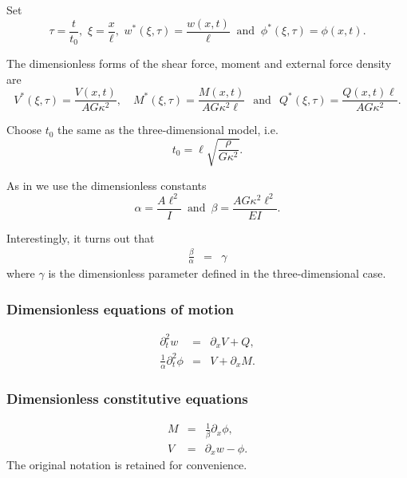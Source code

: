 			Set \[\tau = \frac{t}{t_0}, \,\, \xi = \frac{x}{\ell}, \,\, w^*(\xi,\tau) = \frac{w(x,t)}{\ell} \ \text{ and } \ \phi^*(\xi, \tau) = \phi(x,t).\]

			The dimensionless forms of the shear force, moment and external force density are \[ V^{*}(\xi,\tau) = \frac{V(x,t)}{AG\kappa^2}, \quad M^{*}(\xi,\tau) = \frac{M(x,t)}{A G\kappa^2 \ell} \,\,\, \ \text{and} \ \,\,\, Q^*(\xi,\tau) = \frac{Q(x,t)\ell}{A G\kappa^2}.\]

			Choose $t_0$ the same as the three-dimensional model, i.e. \[t_0 = \ell\sqrt{\frac{\rho}{G\kappa^2}}.\]

			As in \cite{LVV09} we use the dimensionless constants
			\begin{equation*}
				\alpha = \frac{A \ell^2}{I} \,\,\, \text{and} \,\,\, \beta
				=\frac{AG\kappa^2 \ell^2}{EI}.
			\end{equation*}\label{sym:alphabeta}

			Interestingly, it turns out that
			\begin{eqnarray*}
				\frac{\beta}{\alpha} & = & \gamma
			\end{eqnarray*} where $\gamma$ is the dimensionless parameter defined in the three-dimensional case.\\

		\subsubsection*{Dimensionless equations of motion}\label{sssec:1D_Model:DimensionlessEquationsOfMotion}
			\begin{eqnarray}
				\partial_{t}^{2} w &=& \partial_{x}V + Q, \label{eq:1D_Model:EquationOfMotion1D}\\
				\frac{1}{\alpha} \partial_{t}^{2} \phi &=& V + \partial_{x}M.\label{eq:1D_Model:EquationOfMotion2D}
			\end{eqnarray}
		\subsubsection*{Dimensionless constitutive equations}\label{sssec:1D_Model:DimensionlessConstitutiveEquations}
			\begin{eqnarray}
				M &=& \frac{1}{\beta}\partial_x \phi, \label{eq:1D_Model:ConstitutiveEquations1D}\\
				V &=& \partial_x w-\phi. \label{eq:1D_Model:ConstitutiveEquations2D}
			\end{eqnarray}
		The original notation is retained for convenience.

